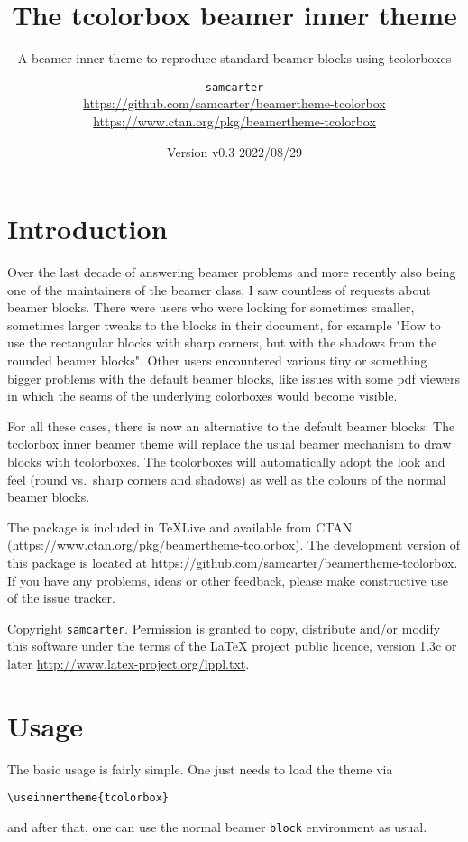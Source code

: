 \documentclass[parskip=half]{scrartcl}
\title{The tcolorbox beamer inner theme}
\subtitle{A beamer inner theme to reproduce standard beamer blocks using tcolorboxes}
\author{%
	\texorpdfstring{
		\texttt{samcarter}\\
		\url{https://github.com/samcarter/beamertheme-tcolorbox}\\
		\url{https://www.ctan.org/pkg/beamertheme-tcolorbox}
	}{samcarter}}
\date{Version v0.3 \textendash{} 2022/08/29}
\begin{document}
\maketitle

\section{Introduction}
\label{intro}

Over the last decade of answering beamer problems and more recently also being one of the maintainers of the beamer class, I saw countless of requests about beamer blocks. There were users who were looking for sometimes smaller, sometimes larger tweaks to the blocks in their document, for example "How to use the rectangular blocks with sharp corners, but with the shadows from the rounded beamer blocks". Other users encountered various tiny or something bigger problems with the default beamer blocks, like issues with some pdf viewers in which the seams of the underlying colorboxes would become visible. 

For all these cases, there is now an alternative to the default beamer blocks: The tcolorbox inner beamer theme will replace the usual beamer mechanism to draw blocks with tcolorboxes. The tcolorboxes will automatically adopt the look and feel (round vs.\ sharp corners and shadows) as well as the colours of the normal beamer blocks.

The package is included in \TeX{}Live 
and available from \textsc{CTAN} (\url{https://www.ctan.org/pkg/beamertheme-tcolorbox}). 
The development version of this package is located at \url{https://github.com/samcarter/beamertheme-tcolorbox}. If you have any problems, ideas or other feedback, please make constructive use of the issue tracker.

Copyright  \texttt{samcarter}. Permission is granted to copy, distribute and\slash or modify this software under the terms of the LaTeX project public licence, version 1.3c or later \url{http://www.latex-project.org/lppl.txt}.

\section{Usage}

The basic usage is fairly simple. One just needs to load the theme via 
\begin{tcolorbox}[title={}]
\begin{lstlisting}
\useinnertheme{tcolorbox}
\end{lstlisting}
\end{tcolorbox}
and after that, one can use the normal beamer \lstinline|block| environment as usual. 
\end{document}
